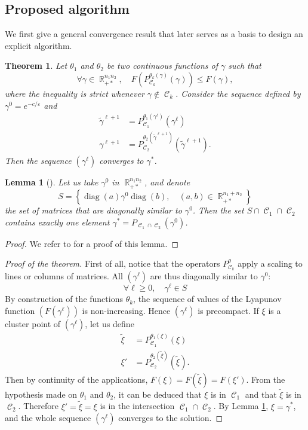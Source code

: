 \documentclass{article} %
\DeclareMathOperator{\IR}{\mathbb{R}}
\DeclareMathOperator{\Ccal}{\mathcal{C}}
\DeclareMathOperator{\diag}{diag}
\renewcommand{\epsilon}{\varepsilon}
\theoremstyle{plain}
\newtheorem{theorem}{Theorem}
\newtheorem{lemma}{Lemma}
\theoremstyle{definition}
\theoremstyle{remark}
\begin{document}
\subsection{Proposed algorithm}
We first give a general convergence result that later serves as a basis to design an explicit algorithm.
\begin{theorem}\label{thm:algo}
Let $\theta_1$ and $\theta_2$ be two continuous functions of $\gamma$ such that
	\begin{equation}\label{eq:cond_theta_k}
	\forall \gamma \in \IR_{+*}^{n_1 n_2},\quad
	F(P_{\Ccal_k}^{\theta_k(\gamma)}(\gamma)) \le F(\gamma) ,
	\end{equation}
	where the inequality is strict whenever $\gamma \notin \Ccal_k$.
	Consider the sequence defined by $\gamma^0 = e^{-c/\epsilon}$ and
	\begin{align*}
	\tilde{\gamma}^{\ell+1} &= P_{\Ccal_1}^{\theta_1(\gamma^{\ell})}(\gamma^{\ell}) \\
	\gamma^{\ell+1} &= P_{\Ccal_2}^{\theta_2(\tilde{\gamma}^{\ell+1})}(\tilde{\gamma}^{\ell+1}).
	\end{align*}
	Then the sequence $(\gamma^{\ell})$ converges to $\gamma^*$.
\end{theorem}


\begin{lemma}[]
	\label{lemma:trivial_intersection}
	Let us take $\gamma^0$ in $\IR_{+*}^{n_1 n_2}$,
	and denote
	\[
	S = \left\{
	\diag(a) \gamma^0 \diag(b),\quad
	(a,b) \in \IR_{+*}^{n_1 + n_2}
	\right\}
	\]
	the set of matrices that are diagonally similar to $\gamma^0$.
	Then the set $S \cap \Ccal_1 \cap \Ccal_2$ contains exactly one element $\gamma^* = P_{\Ccal_1 \cap \Ccal_2}(\gamma^0)$.
\end{lemma}
\begin{proof}
	We refer to \cite{cuturi13} for a proof of this lemma.
\end{proof}


\begin{proof}[Proof of the theorem]
	First of all, notice that the operators $P_{\Ccal_k}^\theta$ apply a scaling to lines or columns of matrices. All $(\gamma^{\ell})$ are thus diagonally similar to $\gamma^0$:
	\[
	\forall \ell\ge0,\quad \gamma^{\ell} \in S
	\]
	By construction of the functions $\theta_k$, the sequence of values of the Lyapunov function $(F(\gamma^{\ell}))$ is non-increasing. Hence $(\gamma^{\ell})$ is precompact.
	If $\xi$ is a cluster point of $(\gamma^{\ell})$, let us define
	\begin{align*}
	\tilde{\xi} &= P_{\Ccal_1}^{\theta_1(\xi)}(\xi) \\
	\xi' &= P_{\Ccal_2}^{\theta_2(\tilde{\xi})}(\tilde{\xi}).
	\end{align*}
	Then by continuity of the applications, $F(\xi) = F(\tilde{\xi}) = F(\xi')$.
	From the hypothesis made on $\theta_1$ and $\theta_2$, it can be deduced that $\xi$ is in $\Ccal_1$ and that $\tilde{\xi}$ is in $\Ccal_2$. Therefore $\xi' = \tilde{\xi} = \xi$ is in the intersection $\Ccal_1 \cap \Ccal_2$.
	By Lemma \ref{lemma:trivial_intersection}, $\xi = \gamma^*$, and the whole sequence $(\gamma^{\ell})$ converges to the solution.
\end{proof}
\end{document}
